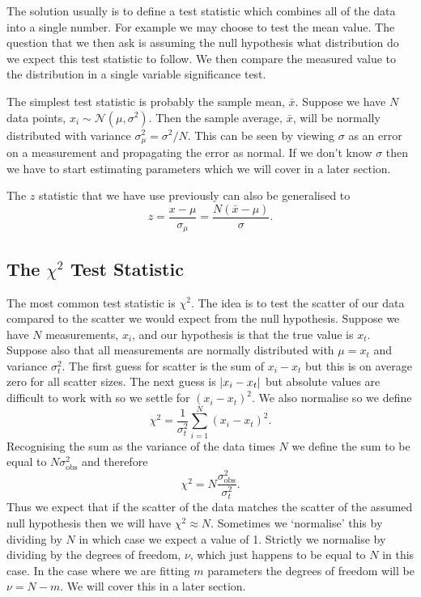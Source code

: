 \documentclass[a4paper]{article}
\newcommand{\distributed}{\sim}
\newcommand{\normal}{\mathcal{N}}
\begin{document}
    The solution usually is to define a test statistic which combines all of the data into a single number.
    For example we may choose to test the mean value.
    The question that we then ask is assuming the null hypothesis what distribution do we expect this test statistic to follow.
    We then compare the measured value to the distribution in a single variable significance test.
    
    The simplest test statistic is probably the sample mean, \(\bar{x}\).
    Suppose we have \(N\) data points, \(x_i\distributed\normal(\mu, \sigma^2)\).
    Then the sample average, \(\bar{x}\), will be normally distributed with variance \(\sigma_\mu^2 = \sigma^2/N\).
    This can be seen by viewing \(\sigma\) as an error on a measurement and propagating the error as normal.
    If we don't know \(\sigma\) then we have to start estimating parameters which we will cover in a later section.
    
    The \(z\) statistic that we have use previously can also be generalised to
    \[z = \frac{x - \mu}{\sigma_\mu} = \frac{N(\bar{x} - \mu)}{\sigma}.\]
    
    \subsection{The \texorpdfstring{\(\chi^2\)}{chi squared} Test Statistic}
    The most common test statistic is \(\chi^2\).
    The idea is to test the scatter of our data compared to the scatter we would expect from the null hypothesis.
    Suppose we have \(N\) measurements, \(x_i\), and our hypothesis is that the true value is \(x_t\).
    Suppose also that all measurements are normally distributed with \(\mu = x_t\) and variance \(\sigma_t^2\).
    The first guess for scatter is the sum of \(x_i - x_t\) but this is on average zero for all scatter sizes.
    The next guess is \(\abs{x_i - x_t}\) but absolute values are difficult to work with so we settle for \((x_i - x_t)^2\).
    We also normalise so we define
    \[\chi^2 = \frac{1}{\sigma_t^2}\sum_{i=1}^{N} (x_i - x_t)^2.\]
    Recognising the sum as the variance of the data times \(N\) we define the sum to be equal to \(N\sigma_\text{obs}^2\) and therefore
    \[\chi^2 = N\frac{\sigma_\text{obs}^2}{\sigma_t^2}.\]
    Thus we expect that if the scatter of the data matches the scatter of the assumed null hypothesis then we will have \(\chi^2 \approx N\).
    Sometimes we `normalise' this by dividing by \(N\) in which case we expect a value of 1.
    Strictly we normalise by dividing by the degrees of freedom, \(\nu\), which just happens to be equal to \(N\) in this case.
    In the case where we are fitting \(m\) parameters the degrees of freedom will be \(\nu = N - m\).
    We will cover this in a later section.
    
\end{document}
